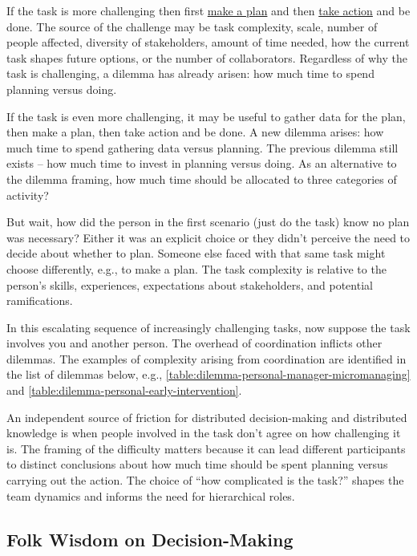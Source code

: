If the task is more challenging then first \underline{make a plan} and then \underline{take action} and be done. 
The source of the challenge may be task complexity, scale, number of people affected, diversity of stakeholders, amount of time needed, how the current task shapes future options, or the number of collaborators. Regardless of why the task is challenging, a dilemma has already arisen: how much time to spend planning versus doing. 

If the task is even more challenging, it may be useful to gather data for the plan, then make a plan, then take action and be done. A new dilemma arises: how much time to spend gathering data versus planning. The previous dilemma still exists -- how much time to invest in planning versus doing. 
As an alternative to the dilemma framing, how much time should be allocated to three categories of activity?

But wait, how did the person in the first scenario (just do the task) know no plan was necessary? Either it was an explicit choice or they didn't perceive the need to decide about whether to plan. Someone else faced with that same task might choose differently, e.g., to make a plan. The task complexity is relative to the person's skills, experiences, expectations about stakeholders, and potential ramifications.

In this escalating sequence of increasingly challenging tasks, now suppose the task involves you and another person. The overhead of coordination inflicts other dilemmas. The examples of complexity arising from coordination are identified in the list of dilemmas below, e.g., \ref{table:dilemma-personal-manager-micromanaging} and \ref{table:dilemma-personal-early-intervention}.

An independent source of friction for distributed decision-making and distributed knowledge is when people involved in the task don't agree on how challenging it is. The framing of the difficulty matters because it can lead different participants to distinct conclusions about how much time should be spent planning versus  carrying out the action. The choice of ``how complicated is the task?'' shapes the team dynamics and informs the need for hierarchical roles. 

\subsection*{Folk Wisdom on Decision-Making}

